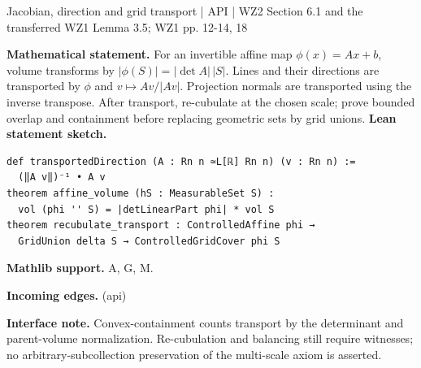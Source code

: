 \documentclass[10pt,a4paper]{article}
\newcommand{\nodecard}[1]{\hyperlink{node-#1}{\texttt{\detokenize{#1}}}}
\begin{document}
\begin{minipage}{\linewidth}
\hypertarget{node-Iaffine}{}
\begin{tcolorbox}[colback=white,colframe=apifg,colbacktitle=apibg,coltitle=ink,boxrule=0.45pt,arc=1.6mm,left=3mm,right=3mm,top=2mm,bottom=2mm,title={\sffamily\bfseries Affine transport API \hfill \texttt{Iaffine}}]
{\sffamily\small\color{muted}Jacobian, direction and grid transport | API | WZ2 Section 6.1 and the transferred WZ1 Lemma 3.5; WZ1 pp. 12-14, 18}\par
\textbf{Mathematical statement.} For an invertible affine map $\phi(x)=Ax+b$, volume transforms by $|\phi(S)|=|\det A|\,|S|$.
Lines and their directions are transported by $\phi$ and $v\mapsto Av/|Av|$. Projection normals are transported using the inverse transpose.
After transport, re-cubulate at the chosen scale; prove bounded overlap and containment before replacing geometric sets by grid unions.
\smallskip\textbf{Lean statement sketch.}
\begin{Verbatim}[fontsize=\small,breaklines=true,breakanywhere=true,tabsize=2]
def transportedDirection (A : Rn n ≃L[ℝ] Rn n) (v : Rn n) :=
  (‖A v‖)⁻¹ • A v
theorem affine_volume (hS : MeasurableSet S) :
  vol (phi '' S) = |detLinearPart phi| * vol S
theorem recubulate_transport : ControlledAffine phi →
  GridUnion delta S → ControlledGridCover phi S
\end{Verbatim}
{\footnotesize\textbf{Mathlib support.} A, G, M.\par
\textbf{Incoming edges.} \nodecard{Igeom} (api)\par}
{\footnotesize\textbf{Interface note.} Convex-containment counts transport by the determinant and parent-volume normalization. Re-cubulation and balancing still require witnesses; no arbitrary-subcollection preservation of the multi-scale axiom is asserted.}
\end{tcolorbox}\end{minipage}\par\medskip
\end{document}
